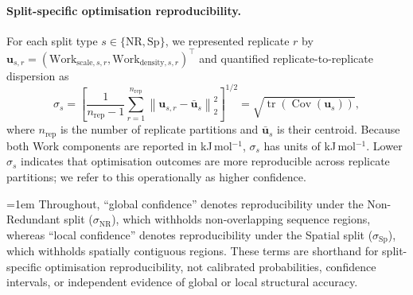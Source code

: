 \paragraph{Split-specific optimisation reproducibility.}
For each split type $s\in\{\mathrm{NR},\mathrm{Sp}\}$, we represented replicate $r$ by $\mathbf u_{s,r}=(\text{Work}_{\text{scale},s,r},\text{Work}_{\text{density},s,r})^\top$ and quantified replicate-to-replicate dispersion as
\begin{equation}
    \sigma_s=\left[\frac{1}{n_\text{rep}-1}\sum_{r=1}^{n_\text{rep}}\left\lVert\mathbf u_{s,r}-\bar{\mathbf u}_s\right\rVert_2^2\right]^{1/2}=\sqrt{\operatorname{tr}\left(\operatorname{Cov}(\mathbf u_s)\right)},
    \label{eq:valdx-replicate-dispersion}
\end{equation}
where $n_\text{rep}$ is the number of replicate partitions and $\bar{\mathbf u}_s$ is their centroid. Because both Work components are reported in kJ\,mol$^{-1}$, $\sigma_s$ has units of kJ\,mol$^{-1}$. Lower $\sigma_s$ indicates that optimisation outcomes are more reproducible across replicate partitions; we refer to this operationally as higher confidence.

{\emergencystretch=1em Throughout, ``global confidence'' denotes reproducibility under the Non-Redundant split ($\sigma_\mathrm{NR}$), which withholds non-overlapping sequence regions, whereas ``local confidence'' denotes reproducibility under the Spatial split ($\sigma_\mathrm{Sp}$), which withholds spatially contiguous regions. These terms are shorthand for split-specific optimisation reproducibility, not calibrated probabilities, confidence intervals, or independent evidence of global or local structural accuracy.\par}

